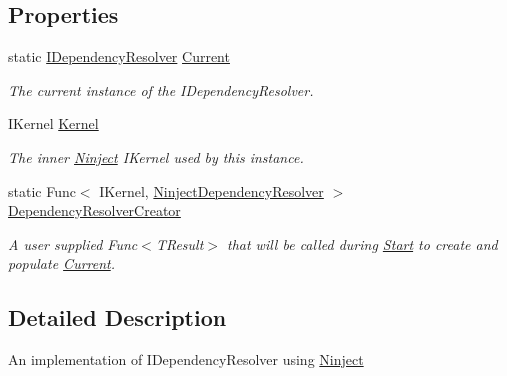 \subsection*{Properties}
\begin{DoxyCompactItemize}
\item 
static \hyperlink{interfaceCqrs_1_1Configuration_1_1IDependencyResolver}{I\+Dependency\+Resolver} \hyperlink{classCqrs_1_1Ninject_1_1Configuration_1_1NinjectDependencyResolver_a2a8ebdf55ecac9eccccc237d422a3f31}{Current}
\begin{DoxyCompactList}\small\item\em The current instance of the I\+Dependency\+Resolver. \end{DoxyCompactList}\item 
I\+Kernel \hyperlink{classCqrs_1_1Ninject_1_1Configuration_1_1NinjectDependencyResolver_a507ba37916f7e77cd5bbcc14543c03b5}{Kernel}
\begin{DoxyCompactList}\small\item\em The inner \hyperlink{namespaceCqrs_1_1Ninject}{Ninject} I\+Kernel used by this instance. \end{DoxyCompactList}\item 
static Func$<$ I\+Kernel, \hyperlink{classCqrs_1_1Ninject_1_1Configuration_1_1NinjectDependencyResolver}{Ninject\+Dependency\+Resolver} $>$ \hyperlink{classCqrs_1_1Ninject_1_1Configuration_1_1NinjectDependencyResolver_a11ea52beeb7420d21c99baeb3501aa0a}{Dependency\+Resolver\+Creator}
\begin{DoxyCompactList}\small\item\em A user supplied Func$<$\+T\+Result$>$ that will be called during \hyperlink{classCqrs_1_1Ninject_1_1Configuration_1_1NinjectDependencyResolver_adc6171ed45679dcbaa67782770ba5083}{Start} to create and populate \hyperlink{classCqrs_1_1Ninject_1_1Configuration_1_1NinjectDependencyResolver_a2a8ebdf55ecac9eccccc237d422a3f31}{Current}. \end{DoxyCompactList}\end{DoxyCompactItemize}


\subsection{Detailed Description}
An implementation of I\+Dependency\+Resolver using \hyperlink{namespaceCqrs_1_1Ninject}{Ninject} 



